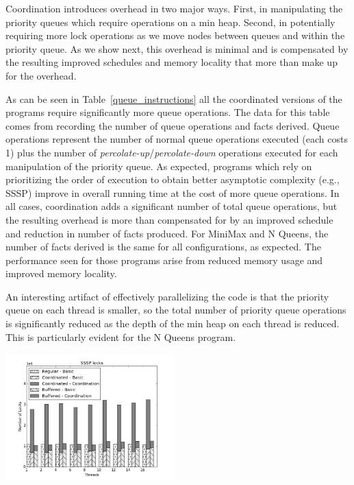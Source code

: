 Coordination introduces overhead in two major ways.  First, in
manipulating the priority queues which require operations on a min
heap.  Second, in potentially requiring more lock operations as we
move nodes between queues and within the priority queue.  As we show
next, this overhead is minimal and is compensated by the resulting improved schedules
and memory locality that more than make up for the overhead.

As can be seen in Table~\ref{queue_instructions} all the coordinated
versions of the programs require significantly more queue operations.
The data for this table comes from recording the number of queue
operations and facts derived.  Queue operations represent the number
of normal queue operations executed (each costs 1) plus the number of
\emph{percolate-up}/\emph{percolate-down} operations executed for each
manipulation of the priority queue.  As expected, programs which rely
on prioritizing the order of execution to obtain better asymptotic
complexity (e.g., SSSP) improve in overall running time at the cost of
more queue operations.  In all cases, coordination adds a significant
number of total queue operations, but the resulting overhead is more
than compensated for by an improved schedule and reduction in number
of facts produced. For MiniMax and N Queens, the number of facts
derived is the same for all configurations, as expected. The
performance seen for those programs arise from reduced memory usage
and improved memory locality.

An interesting artifact of effectively parallelizing the code is that
the priority queue on each thread is smaller, so the total number of
priority queue operations is significantly reduced as the depth of the
min heap on each thread is reduced.  This is particularly evident for
the N Queens program.

\begin{topfig}
   \begin{center}
      \includegraphics[width=6.5cm]{results/locks/sssp-locks.png}
   \end{center}
\end{topfig}


